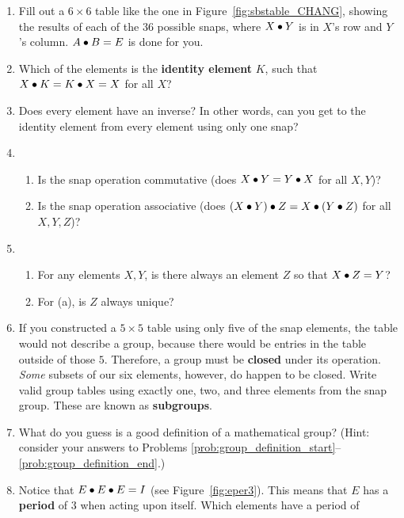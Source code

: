 \documentclass[../gatm.tex]{subfiles}
\begin{document}
\begin{enumerate}
	\item Fill out a $6\times 6$ table like the one in Figure~\ref{fig:sbstable_CHANG}, showing the results of each of the $36$ possible snaps, where $X\bullet Y$ is in $X$'s row and $Y$'s column. $A\bullet B=E$ is done for you.
	\item Which of the elements is the \textbf{identity element} $K$, such that $X\bullet K = K\bullet X = X$ for all $X$? \label{prob:group_definition_start}
	\item Does every element have an inverse? In other words, can you get to the identity element from every element using only one snap?
	\item \begin{enumerate}
		      \item Is the snap operation commutative (does $X \bullet Y = Y \bullet X$ for all $X,Y$)?
		      \item Is the snap operation associative (does $(X \bullet Y) \bullet Z = X \bullet (Y\bullet Z)$ for all $X,Y,Z$)?
	      \end{enumerate}
	\item \begin{enumerate}
		      \item For any elements $X, Y$, is there always an element $Z$ so that $X\bullet Z=Y$?
		      \item For (a), is $Z$ always unique?
	      \end{enumerate}
	\item If you constructed a $5\times 5$ table using only five of the snap elements, the table would not describe a group, because there would be entries in the table outside of those $5$. Therefore, a group must be \textbf{closed} under its operation. \textit{Some} subsets of our six elements, however, do happen to be closed. Write valid group tables using exactly one, two, and three elements from the snap group. These are known as \textbf{subgroups}.\label{prob:group_definition_end}
	\item What do you guess is a good definition of a mathematical group? (Hint: consider your answers to Problems \ref{prob:group_definition_start}--\ref{prob:group_definition_end}.)
	\item Notice that $E\bullet E\bullet E=I$ (see Figure~\ref{fig:eper3}). This means that $E$ has a \textbf{period} of $3$ when acting upon itself. Which elements have a period of
	      \begin{multicols}{3}
		      \begin{enumerate}

\end{enumerate}
\end{multicols}
\end{enumerate}
\end{document}
